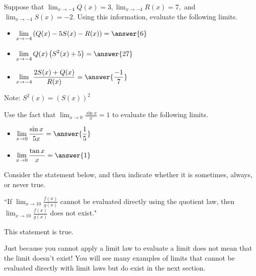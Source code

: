 \documentclass[handout]{ximera}
\begin{document}
\begin{exercise}

Suppose that $\displaystyle\lim_{x \to -4} Q(x) = 3, \displaystyle\lim_{x\to -4} R(x) = 7,$ and $\displaystyle\lim_{x\to -4} S(x) = -2$.  Using this information, evaluate the following limits. 

\begin{itemize}

\item $\displaystyle\lim_{x \to -4} \left( Q(x) -5S(x) - R(x) \right) = \answer{6}$

\item $\displaystyle\lim_{x \to -4} Q(x)\left(S^2(x) + 5 \right) = \answer{27}$

\item $\displaystyle\lim_{x \to -4} \frac{2S(x) + Q(x)}{R(x)} = \answer{\frac{-1}{7}}$

\end{itemize}

\begin{hint}

Note: $S^2(x) = (S(x))^2$

\end{hint}

\end{exercise}

\begin{exercise}

Use the fact that $\displaystyle\lim_{x \to 0} \frac{\sin x}{x} = 1$ to evaluate the following limits. 

\begin{itemize}

\item $\displaystyle\lim_{x \to 0} \frac{ \sin x}{5x} = \answer{\frac{1}{5}}$

\item $\displaystyle\lim_{x \to 0} \frac{\tan x}{x} = \answer{1}$

\end{itemize}
\end{exercise}

\begin{exercise}

Consider the statement below, and then indicate whether it is sometimes, always, or never true.

\begin{center} ``If $\displaystyle\lim_{x \to 10} \frac{f(x)}{g(x)}$ cannot be evaluated directly using the quotient law, then $\displaystyle\lim_{x \to 10} \frac{f(x)}{g(x)}$ does not exist." \end{center}

This statement is  true.

\begin{feedback}[correct]
Just because you cannot apply a limit law to evaluate a limit does not mean that the limit doesn't exist!  You will see many examples of limits that cannot be evaluated directly with limit laws but do exist in the next section. 
\end{feedback}

\end{exercise}
\end{document}
